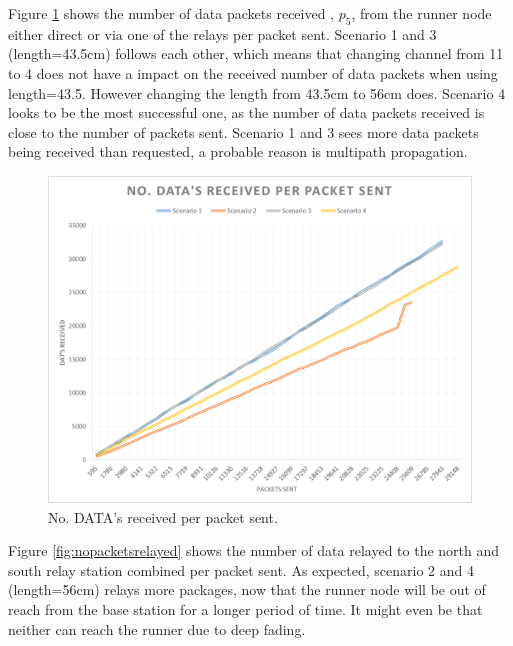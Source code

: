 \noindent Figure \ref{fig:nodatareceived} shows the number of data packets received , $p_5$, from the runner node either direct or via one of the relays per packet sent. Scenario 1 and 3 (length=43.5cm) follows each other, which means that changing channel from 11 to 4 does not have a impact on the received number of data packets when using length=43.5. However changing the length from 43.5cm to 56cm does. Scenario 4 looks to be the most successful one, as the number of data packets received is close to the number of packets sent. Scenario 1 and 3 sees more data packets being received than requested, a probable reason is multipath propagation.

\begin{figure}[h]
	\centering
	\includegraphics[width=1\linewidth]{results/NoDataReceived}
	\caption{No. DATA's received per packet sent.}
	\label{fig:nodatareceived}
\end{figure}

\noindent Figure \ref{fig:nopacketsrelayed} shows the number of data relayed to the north  and south relay station combined per packet sent. As expected, scenario 2 and 4 (length=56cm) relays more packages, now that the runner node will be out of reach from the base station for a longer period of time. It might even be that neither can reach the runner due to deep fading.

